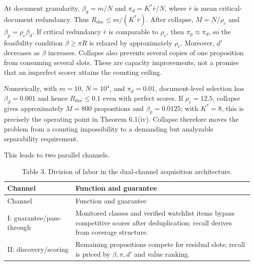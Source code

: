 \documentclass[
  11pt]{article}
\begin{document}
At document granularity, \(\beta_d=m/N\) and \(\pi_d=K^*\bar r/N\), where \(\bar r\) is mean critical-document redundancy. Thus \(R_{\mathrm{doc}}\leq m/(K^*\bar r)\). After collapse, \(M=N/\rho_c\) and \(\beta_p=\rho_c\beta_d\). If critical redundancy \(\bar r\) is comparable to \(\rho_c\), then \(\pi_p\approx\pi_d\), so the feasibility condition \(\beta\geq\pi R\) is relaxed by approximately \(\rho_c\). Moreover, \(\underline d'\) decreases as \(\beta\) increases. Collapse also prevents several copies of one proposition from consuming several slots. These are capacity improvements, not a promise that an imperfect scorer attains the counting ceiling.

Numerically, with \(m=10\), \(N=10^4\), and \(\pi_d=0.01\), document-level selection has \(\beta_d=0.001\) and hence \(R_{\mathrm{doc}}\leq0.1\) even with perfect scores. If \(\rho_c=12.5\), collapse gives approximately \(M=800\) propositions and \(\beta_p=0.0125\); with \(K^*=8\), this is precisely the operating point in Theorem 6.1(iv). Collapse therefore moves the problem from a counting impossibility to a demanding but analyzable separability requirement.

This leads to two parallel channels.

\begin{longtable}[]{@{}
  >{\raggedright\arraybackslash}p{}
  >{\raggedright\arraybackslash}p{}@{}}
\caption{Table 3. Division of labor in the dual-channel acquisition architecture.}\tabularnewline
\toprule\noalign{}
\begin{minipage}[b]{\linewidth}\raggedright
Channel
\end{minipage} & \begin{minipage}[b]{\linewidth}\raggedright
Function and guarantee
\end{minipage} \\
\midrule\noalign{}
\endfirsthead
\toprule\noalign{}
\begin{minipage}[b]{\linewidth}\raggedright
Channel
\end{minipage} & \begin{minipage}[b]{\linewidth}\raggedright
Function and guarantee
\end{minipage} \\
\midrule\noalign{}
\endhead
\bottomrule\noalign{}
\endlastfoot
I: guarantee/pass-through & Monitored classes and verified watchlist items bypass competitive scores after deduplication; recall derives from coverage structure. \\
II: discovery/scoring & Remaining propositions compete for residual slots; recall is priced by \(\beta,\pi,d'\) and value ranking. \\
\end{longtable}
\end{document}

